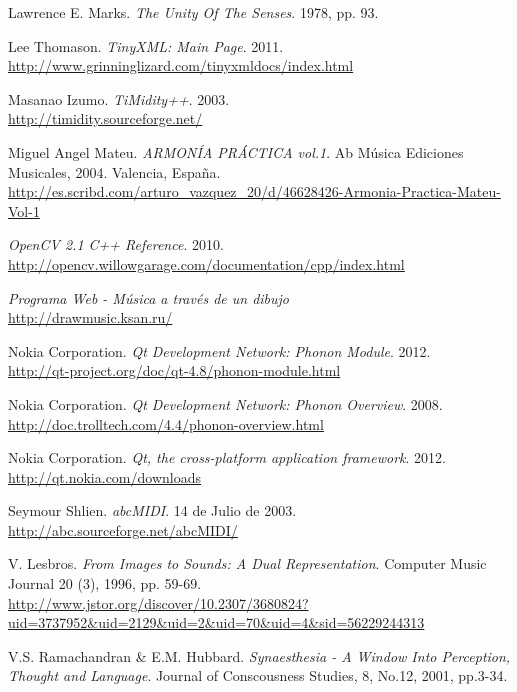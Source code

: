 \begin{thebibliography}{9}
 Lawrence E. Marks. \emph{The Unity Of The Senses}. 1978, pp. 93.
 
  Lee Thomason. \emph{TinyXML: Main Page}. 2011.\\
  \url{http://www.grinninglizard.com/tinyxmldocs/index.html}

  Masanao Izumo. \emph{TiMidity++}. 2003.\\
  \url{http://timidity.sourceforge.net/}
  
	Miguel Angel Mateu. \emph{ARMONÍA PRÁCTICA vol.1}. Ab Música Ediciones Musicales, 2004. Valencia, España.\\
	\url{http://es.scribd.com/arturo_vazquez_20/d/46628426-Armonia-Practica-Mateu-Vol-1}
  
  \emph{OpenCV 2.1 C++ Reference}. 2010.\\
  \url{http://opencv.willowgarage.com/documentation/cpp/index.html}

\emph{Programa Web - Música a través de un dibujo}\\
\url{http://drawmusic.ksan.ru/}

  Nokia Corporation. \emph{Qt Development Network: Phonon Module}. 2012.\\
 \url{http://qt-project.org/doc/qt-4.8/phonon-module.html}
 
  Nokia Corporation. \emph{Qt Development Network: Phonon Overview}. 2008.\\
 \url{http://doc.trolltech.com/4.4/phonon-overview.html}

  Nokia Corporation. \emph{Qt, the cross-platform application framework}. 2012.\\
  \url{http://qt.nokia.com/downloads} 
 
  Seymour Shlien. \emph{abcMIDI}. 14 de Julio de 2003.\\
  \url{http://abc.sourceforge.net/abcMIDI/} 

 V. Lesbros. \emph{From Images to Sounds: A Dual Representation}. Computer Music Journal 20 (3), 1996, pp. 59-69.\\
 \url{http://www.jstor.org/discover/10.2307/3680824?uid=3737952&uid=2129&uid=2&uid=70&uid=4&sid=56229244313}

  V.S. Ramachandran \& E.M. Hubbard. \emph{Synaesthesia - A Window Into Perception, Thought and Language}. Journal of Conscousness Studies, 8, No.12, 2001, pp.3-34.


\end{thebibliography}

